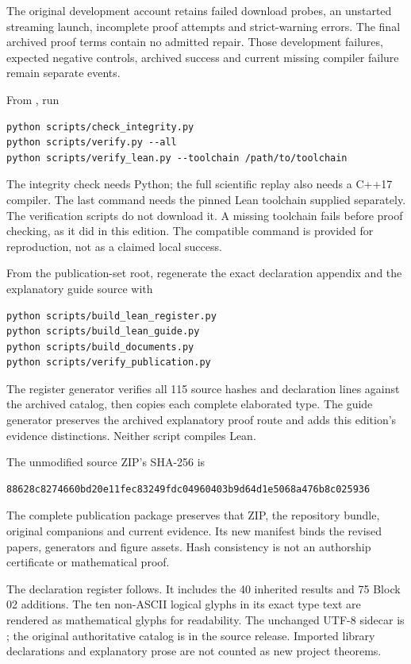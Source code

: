 The original development account retains failed download probes, an unstarted
streaming launch, incomplete proof attempts and strict-warning errors. The
final archived proof terms contain no admitted repair. Those development
failures, expected negative controls, archived success and current missing
compiler failure remain separate events.

From , run
\begin{lstlisting}
python scripts/check_integrity.py
python scripts/verify.py --all
python scripts/verify_lean.py --toolchain /path/to/toolchain
\end{lstlisting}
The integrity check needs Python; the full scientific replay also needs a
C++17 compiler. The last command needs the pinned
Lean toolchain supplied separately. The verification scripts do not download
it. A missing toolchain fails before proof checking, as it did in this edition.
The compatible command is provided for reproduction, not as a claimed local
success.

From the publication-set root, regenerate the exact declaration appendix and
the explanatory guide source with
\begin{lstlisting}
python scripts/build_lean_register.py
python scripts/build_lean_guide.py
python scripts/build_documents.py
python scripts/verify_publication.py
\end{lstlisting}
The register generator verifies all 115 source hashes and declaration lines
against the archived catalog, then copies each complete elaborated type.
The guide generator preserves the archived explanatory proof route and adds
this edition's evidence distinctions. Neither script compiles Lean.

The unmodified source ZIP's SHA-256 is
\begin{lstlisting}
88628c8274660bd20e11fec83249fdc04960403b9d64d1e5068a476b8c025936
\end{lstlisting}
The complete publication package preserves that ZIP, the repository bundle,
original companions and current evidence. Its new manifest binds the revised
papers, generators and figure assets. Hash consistency is not an authorship
certificate or mathematical proof.

The declaration register follows. It includes the 40 inherited results and
75 Block 02 additions. The ten non-ASCII logical glyphs in its exact type text
are rendered as mathematical glyphs for readability. The unchanged UTF-8
sidecar is ; the original authoritative
catalog is  in the source
release. Imported library declarations and explanatory prose are not counted
as new project theorems.


